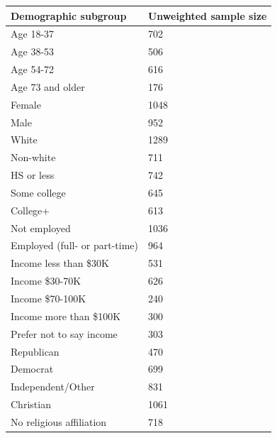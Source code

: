 \documentclass{article}
\begin{document}
\begin{table}[h]
\centering
\begin{tabular}{p{5cm}p{2.5cm}}
\hline
Demographic subgroup & Unweighted sample size\\
\hline
Age 18-37 & 702\\

Age 38-53 & 506\\

Age 54-72 & 616\\

Age 73 and older & 176\\

Female & 1048\\

Male & 952\\

White & 1289\\

Non-white & 711\\

HS or less & 742\\

Some college & 645\\

College+ & 613\\

Not employed & 1036\\

Employed (full- or part-time) & 964\\

Income less than \$30K & 531\\

Income \$30-70K & 626\\

Income \$70-100K & 240\\

Income more than \$100K & 300\\

Prefer not to say income & 303\\

Republican & 470\\

Democrat & 699\\

Independent/Other & 831\\

Christian & 1061\\

No religious affiliation & 718\\


\end{tabular}
\end{table}
\end{document}
